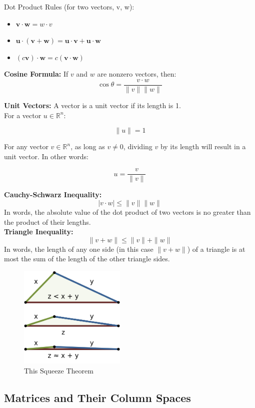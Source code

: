 \documentclass[11pt]{article}
\begin{document}
Dot Product Rules (for two vectors, v, w):
\begin{itemize}
    \item $ \boldsymbol{v} \cdot \boldsymbol{w} = w \cdot v $
    \item $ \boldsymbol{u} \cdot (\boldsymbol{v} + \boldsymbol{w}) = \boldsymbol{u} \cdot 
    \boldsymbol{v} + \boldsymbol{u} \cdot \boldsymbol{w} $
    \item $ (c\boldsymbol{v}) \cdot \boldsymbol{w} = c(\boldsymbol{v} \cdot \boldsymbol{w}) $
\end{itemize}

\textbf{Cosine Formula:} If $v$ and $w$ are nonzero vectors, then:
\[ \cos \theta = \frac{v \cdot w}{\|v\| \|w\|}\]

\textbf{Unit Vectors:} A vector is a unit vector if its length is 1. \\
For a vector $u \in \mathbb{R}^n$:

\[ \|u\| = 1\]

For any vector $v \in \mathbb{R}^n$, as long as $v \ne 0$, dividing $v$ by its length will
result in a unit vector. In other words:

\[ u = \frac{v}{\|v\|} \]

\textbf{Cauchy-Schwarz Inequality:} 
\[ | v \cdot w | \le \|v\|  \|w\| \]
In words, the absolute value of the dot product of two vectors is no greater than the product 
of their lengths. \\

\textbf{Triangle Inequality:} 
\[\|v + w\| \le \|v\| + \|w\|\]
In words, the length of any one side (in this case $\|v+w\|$) of a triangle is at most the sum
of the length of the other triangle sides.

\begin{figure}[H] 
	\centering 
	\includegraphics[width=2in]{imgs/triangle_inequality.png}
	\caption{This Squeeze Theorem}
\end{figure}

\subsection{Matrices and Their Column Spaces}
\end{document}
